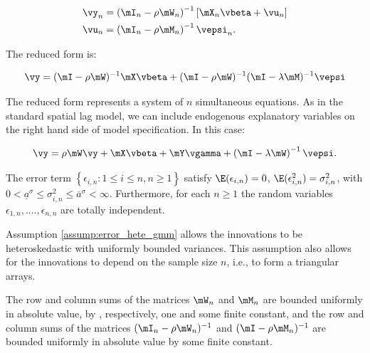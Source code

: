 \documentclass[english,12pt]{book}\usepackage[]{graphicx}\usepackage[]{xcolor}
\begin{document}
\begin{equation*}
	\begin{aligned}
	\vy_n  & = \left(\mI_n - \rho \mW_n\right)^{-1}\left[\mX_n\vbeta + \vu_n\right] \\
	\vu_n  & = \left(\mI_n -  \rho \mM_n\right)^{-1}\vepsi_n.
	\end{aligned}
\end{equation*}

The reduced form is:

\begin{equation*}
\vy = (\mI - \rho\mW)^{-1}\mX\vbeta +(\mI -\rho\mW)^{-1}(\mI - \lambda\mM)^{-1}\vepsi 
\end{equation*}

The reduced form represents a system of $n$ simultaneous equations. As in the standard spatial lag model, we can include endogenous explanatory variables on the right hand side of model specification. In this case:

\begin{equation*}
\vy = \rho\mW\vy + \mX\vbeta + \mY\vgamma + \left(\mI - \lambda\mW\right)^{-1}\vepsi. 
\end{equation*}


\begin{assumption}\label{assump:error_hete_gmm} 
	The error term  $\left\lbrace\epsilon_{i,n}: 1 \leq i \leq n, n\geq 1\right\rbrace$ satisfy $\E(\epsilon_{i,n}) = 0$, $\E(\epsilon_{i,n}^2) = \sigma^2_{i,n}$, with $0 < \underline{a}^\sigma \leq \sigma^2_{i,n}\leq \overline{a}^\sigma<\infty$. Furthermore, for each $n\geq 1$ the random variables $\epsilon_{1,n},...., \epsilon_{n,n}$ are totally independent.  
\end{assumption}

Assumption \ref{assump:error_hete_gmm} allows the innovations to be heteroskedastic with uniformly bounded variances. This assumption also allows for the innovations to depend on the sample size $n$, i.e., to form a triangular arrays. 

\begin{assumption}\label{assump:bounded_matrices_hetgmm}
		 The row and column sums of the matrices $\mW_n$ and $\mM_n$ are bounded uniformly in absolute value, by , respectively, one and some finite constant, and the row and column sums of the matrices $(\mI_n - \rho\mW_n)^{-1}$ and  $(\mI - \rho\mM_n)^{-1}$ are bounded uniformly in absolute value by some finite constant.
\end{assumption}	
\end{document}
